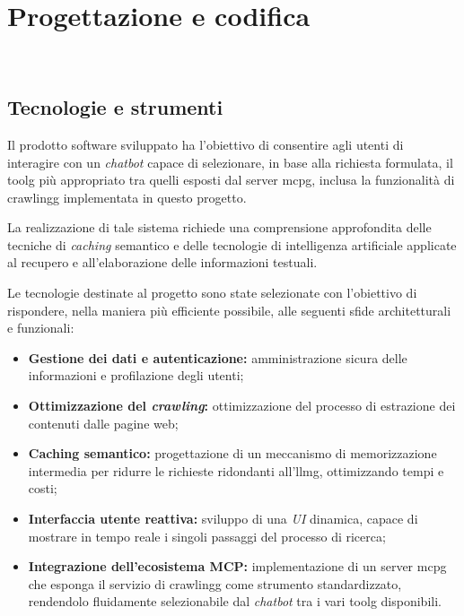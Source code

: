 \chapter{Progettazione e codifica}
\label{cap:progettazione-codifica}

\\

\section{Tecnologie e strumenti}
\label{sec:tecnologie-strumenti}
Il prodotto software sviluppato ha l'obiettivo di consentire agli utenti 
di interagire con un \textit{chatbot} capace di selezionare, in base alla 
richiesta formulata, il \gls{toolg} più appropriato tra quelli esposti 
dal server \gls{mcpg}, inclusa la funzionalità di \gls{crawlingg} 
implementata in questo progetto. 

La realizzazione di tale sistema richiede una comprensione approfondita 
delle tecniche di \textit{caching} semantico e delle tecnologie di intelligenza 
artificiale applicate al recupero e all'elaborazione delle informazioni testuali.

Le tecnologie destinate al progetto sono state selezionate con l'obiettivo 
di rispondere, nella maniera più efficiente possibile, alle seguenti 
sfide architetturali e funzionali:
\begin{itemize}
    \item \textbf{Gestione dei dati e autenticazione:} amministrazione sicura delle informazioni e profilazione degli utenti;
    \item \textbf{Ottimizzazione del \textit{crawling}:} ottimizzazione del processo di estrazione dei contenuti dalle pagine web;
    \item \textbf{Caching semantico:} progettazione di un meccanismo di memorizzazione intermedia per ridurre le richieste ridondanti all'\gls{llmg}, ottimizzando tempi e costi;
    \item \textbf{Interfaccia utente reattiva:} sviluppo di una \textit{UI} dinamica, capace di mostrare in tempo reale i singoli passaggi del processo di ricerca;
    \item \textbf{Integrazione dell'ecosistema MCP:} implementazione di un server \gls{mcpg} che esponga il servizio di \gls{crawlingg} come strumento standardizzato, rendendolo fluidamente selezionabile dal \textit{chatbot} tra i vari \gls{toolg} disponibili.
\end{itemize}

